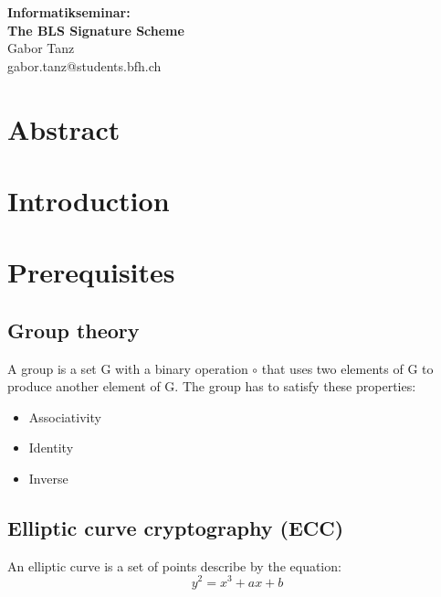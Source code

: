 \documentclass[a4paper,12pt]{scrartcl}
\begin{document}
\begin{titlepage}
\begin{center}
\vspace*{3cm}
\vspace{1cm}
\Huge \textbf{Informatikseminar: \\ The BLS Signature Scheme} \\
\vspace{6cm}
\vspace{1cm}
\large Gabor Tanz \\ gabor.tanz@students.bfh.ch \\
\end{center}
\end{titlepage}

\tableofcontents
\pagebreak

\section{Abstract}
\pagebreak

\section{Introduction}
\pagebreak

\section{Prerequisites}
\subsection{Group theory}
A group is a set G with a binary operation \(\circ \) \cite[Slide 2.16]{crypto-slides-haenni} that uses two elements of G to produce another element of G. The group has to satisfy these properties:
\begin{itemize}
	\item Associativity
	\item Identity
	\item Inverse
\end{itemize}

\subsection{Elliptic curve cryptography (ECC)}
An elliptic curve is a set of points describe by the equation:
\begin{equation*}
y^2 = x^3 + ax + b
\end{equation*}
\end{document}
